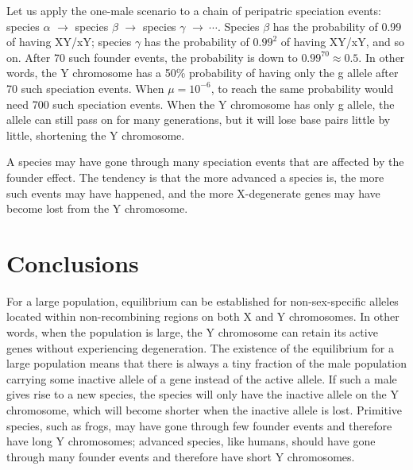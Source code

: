 \documentclass[referee,sn-basic]{sn-jnl}%
\theoremstyle{thmstyleone}%
\theoremstyle{thmstyletwo}%
\theoremstyle{thmstylethree}%
\begin{document}
Let us apply the one-male scenario to a chain of peripatric speciation \citep{Colvin2018} events: species $\alpha$ $\to$ species $\beta$ $\to$ species $\gamma$ $\to \ \cdots$. Species $\beta$ has the probability of 0.99 of having XY/xY; species $\gamma$ has the probability of $0.99^2$ of having XY/xY, and so on. After 70 such founder events, the probability is down to $0.99^{70}\approx 0.5$. In other words, the Y chromosome has a 50\% probability of having only the g allele after 70 such speciation events. When $\mu=10^{-6}$, to reach the same probability would need 700 such speciation events. When the Y chromosome has only g allele, the allele can still pass on for many generations, but it will lose base pairs little by little, shortening the Y chromosome. 

A species may have gone through many speciation events that are affected by the founder effect. The tendency is that the more advanced a species is, the more such events may have happened, and the more X-degenerate genes may have become lost from the Y chromosome.

\section{Conclusions}
For a large population, equilibrium can be established for non-sex-specific alleles located within non-recombining regions on both X and Y chromosomes. In other words, when the population is large, the Y chromosome can retain its active genes without experiencing degeneration. 
The existence of the equilibrium for a large population means that there is always a tiny fraction of the male population carrying some inactive allele of a gene instead of the active allele. If such a male gives rise to a new species, the species will only have the inactive allele on the Y chromosome, which will become shorter when the inactive allele is lost. 
Primitive species, such as frogs, may have gone through few founder events and therefore have long Y chromosomes; advanced species, like humans, should have gone through many founder events and therefore have short Y chromosomes.
\end{document}
